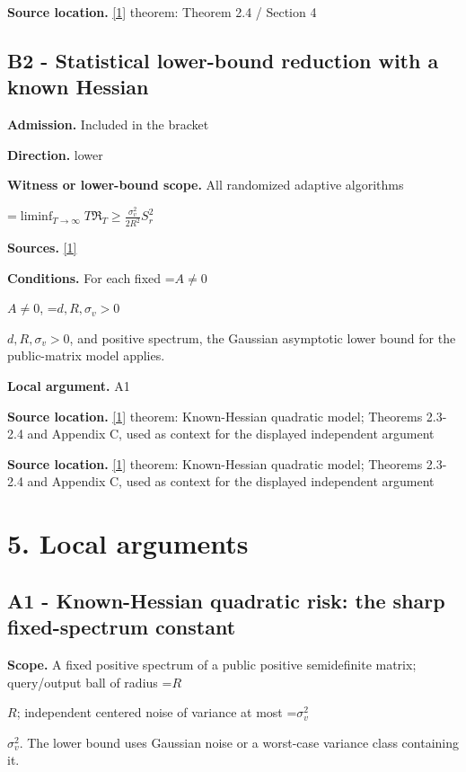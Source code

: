 \documentclass[10pt,a4paper]{article}
\newcommand{\AtlasMath}[1]{\par\begingroup\centering\setbox0=\hbox{$\displaystyle #1$}\ifdim\wd0>1.4\linewidth\typeout{ATLAS WIDE FORMULA: \the\wd0}\fi\ifdim\wd0>\linewidth\resizebox{\linewidth}{!}{\box0}\else\box0\fi\par\endgroup}
\newcommand{\AtlasInlineMath}[1]{\begingroup\setbox0=\hbox{$#1$}\ifdim\wd0>.4\linewidth\endgroup\AtlasMath{#1}\else\endgroup$#1$\fi}
\begin{document}
\textbf{Source location.} \href{https://proceedings.neurips.cc/paper_files/paper/2023/file/6e60a9023d2c63f7f0856910129ae753-Paper-Conference.pdf}{[1]} theorem: Theorem 2.4 / Section 4

\subsection{B2 - Statistical lower-bound reduction with a known Hessian}
\textbf{Admission.} Included in the bracket

\textbf{Direction.} lower

\textbf{Witness or lower-bound scope.} All randomized adaptive algorithms

\AtlasMath{\liminf_{T\to\infty}T\mathfrak R_T\ge\frac{\sigma_v^2}{2R^2}S_r^2}
\textbf{Sources.} \href{https://proceedings.neurips.cc/paper_files/paper/2023/file/6e60a9023d2c63f7f0856910129ae753-Paper-Conference.pdf}{[1]}

\textbf{Conditions.} For each fixed \AtlasInlineMath{A\ne0}, \AtlasInlineMath{d,R,\sigma_v>0}, and positive spectrum, the Gaussian asymptotic lower bound for the public-matrix model applies.

\textbf{Local argument.} A1

\textbf{Source location.} \href{https://proceedings.neurips.cc/paper_files/paper/2023/file/6e60a9023d2c63f7f0856910129ae753-Paper-Conference.pdf}{[1]} theorem: Known-Hessian quadratic model; Theorems 2.3-2.4 and Appendix C, used as context for the displayed independent argument

\textbf{Source location.} \href{https://proceedings.neurips.cc/paper_files/paper/2023/file/6e60a9023d2c63f7f0856910129ae753-Paper-Conference.pdf}{[1]} theorem: Known-Hessian quadratic model; Theorems 2.3-2.4 and Appendix C, used as context for the displayed independent argument

\section{5. Local arguments}
\subsection{A1 - Known-Hessian quadratic risk: the sharp fixed-spectrum constant}
\textbf{Scope.} A fixed positive spectrum of a public positive semidefinite matrix; query/output ball of radius \AtlasInlineMath{R}; independent centered noise of variance at most \AtlasInlineMath{\sigma_v^2}. The lower bound uses Gaussian noise or a worst-case variance class containing it.
\end{document}
